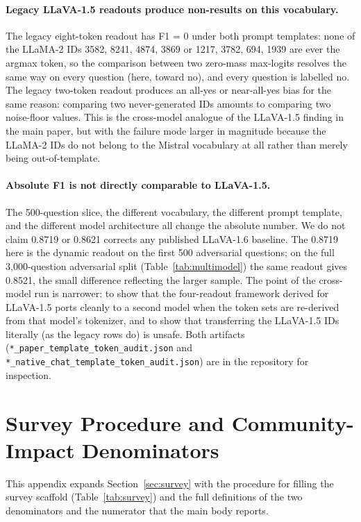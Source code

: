 \documentclass{article}
\begin{document}
\paragraph{Legacy LLaVA-1.5 readouts produce non-results on this
vocabulary.} The legacy eight-token readout has F1 = 0 under both
prompt templates: none of the LLaMA-2 IDs 3582, 8241, 4874, 3869 or
1217, 3782, 694, 1939 are ever the argmax token, so the comparison
between two zero-mass max-logits resolves the same way on every
question (here, toward no), and every question is labelled no. The
legacy two-token readout produces an all-yes or near-all-yes bias for
the same reason: comparing two never-generated IDs amounts to
comparing two noise-floor values. This is the cross-model analogue
of the LLaVA-1.5 finding in the main paper, but with the failure mode
larger in magnitude because the LLaMA-2 IDs do not belong to the
Mistral vocabulary at all rather than merely being out-of-template.

\paragraph{Absolute F1 is not directly comparable to LLaVA-1.5.} The
500-question slice, the different vocabulary, the different prompt
template, and the different model architecture all change the
absolute number. We do not claim 0.8719 or 0.8621 corrects any
published LLaVA-1.6 baseline. The 0.8719 here is the dynamic readout on
the first 500 adversarial questions; on the full 3{,}000-question
adversarial split (Table~\ref{tab:multimodel}) the same readout gives
0.8521, the small difference reflecting the larger sample. The point of the cross-model run is
narrower: to show that the four-readout framework derived for
LLaVA-1.5 ports cleanly to a second model when the token sets are
re-derived from that model's tokenizer, and to show that transferring
the LLaVA-1.5 IDs literally (as the legacy rows do) is unsafe. Both
artifacts (\texttt{*\_paper\_template\_token\_audit.json} and
\texttt{*\_native\_chat\_template\_token\_audit.json}) are in the
repository for inspection.

\section{Survey Procedure and Community-Impact Denominators}
\label{app:survey}

This appendix expands Section~\ref{sec:survey} with the procedure for
filling the survey scaffold (Table~\ref{tab:survey}) and the full
definitions of the two denominators and the numerator that the main body
reports.
\end{document}
